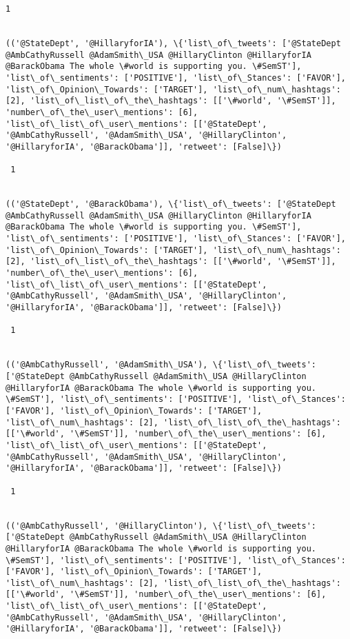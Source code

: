 \documentclass[11pt]{article}
\begin{document}
\begin{Verbatim}[commandchars=\\\{\}]
 1
 

(('@StateDept', '@HillaryforIA'), \{'list\_of\_tweets': ['@StateDept @AmbCathyRussell @AdamSmith\_USA @HillaryClinton @HillaryforIA @BarackObama The whole \#world is supporting you. \#SemST'], 'list\_of\_sentiments': ['POSITIVE'], 'list\_of\_Stances': ['FAVOR'], 'list\_of\_Opinion\_Towards': ['TARGET'], 'list\_of\_num\_hashtags': [2], 'list\_of\_list\_of\_the\_hashtags': [['\#world', '\#SemST']], 'number\_of\_the\_user\_mentions': [6], 'list\_of\_list\_of\_user\_mentions': [['@StateDept', '@AmbCathyRussell', '@AdamSmith\_USA', '@HillaryClinton', '@HillaryforIA', '@BarackObama']], 'retweet': [False]\})

 1
 

(('@StateDept', '@BarackObama'), \{'list\_of\_tweets': ['@StateDept @AmbCathyRussell @AdamSmith\_USA @HillaryClinton @HillaryforIA @BarackObama The whole \#world is supporting you. \#SemST'], 'list\_of\_sentiments': ['POSITIVE'], 'list\_of\_Stances': ['FAVOR'], 'list\_of\_Opinion\_Towards': ['TARGET'], 'list\_of\_num\_hashtags': [2], 'list\_of\_list\_of\_the\_hashtags': [['\#world', '\#SemST']], 'number\_of\_the\_user\_mentions': [6], 'list\_of\_list\_of\_user\_mentions': [['@StateDept', '@AmbCathyRussell', '@AdamSmith\_USA', '@HillaryClinton', '@HillaryforIA', '@BarackObama']], 'retweet': [False]\})

 1
 

(('@AmbCathyRussell', '@AdamSmith\_USA'), \{'list\_of\_tweets': ['@StateDept @AmbCathyRussell @AdamSmith\_USA @HillaryClinton @HillaryforIA @BarackObama The whole \#world is supporting you. \#SemST'], 'list\_of\_sentiments': ['POSITIVE'], 'list\_of\_Stances': ['FAVOR'], 'list\_of\_Opinion\_Towards': ['TARGET'], 'list\_of\_num\_hashtags': [2], 'list\_of\_list\_of\_the\_hashtags': [['\#world', '\#SemST']], 'number\_of\_the\_user\_mentions': [6], 'list\_of\_list\_of\_user\_mentions': [['@StateDept', '@AmbCathyRussell', '@AdamSmith\_USA', '@HillaryClinton', '@HillaryforIA', '@BarackObama']], 'retweet': [False]\})

 1
 

(('@AmbCathyRussell', '@HillaryClinton'), \{'list\_of\_tweets': ['@StateDept @AmbCathyRussell @AdamSmith\_USA @HillaryClinton @HillaryforIA @BarackObama The whole \#world is supporting you. \#SemST'], 'list\_of\_sentiments': ['POSITIVE'], 'list\_of\_Stances': ['FAVOR'], 'list\_of\_Opinion\_Towards': ['TARGET'], 'list\_of\_num\_hashtags': [2], 'list\_of\_list\_of\_the\_hashtags': [['\#world', '\#SemST']], 'number\_of\_the\_user\_mentions': [6], 'list\_of\_list\_of\_user\_mentions': [['@StateDept', '@AmbCathyRussell', '@AdamSmith\_USA', '@HillaryClinton', '@HillaryforIA', '@BarackObama']], 'retweet': [False]\})


\end{Verbatim}
\end{document}
